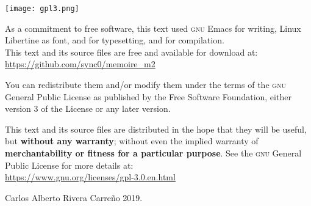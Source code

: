 \newpage
\begin{center}
\vspace*{\fill}
\noindent
\texttt{[image: gpl3.png]}\par
\vspace{1\baselineskip}

As a commitment to free software, this text used  \textsc{gnu}
Emacs for writing, Linux Libertine as font,  \hologo{\fmtname}
and \KOMAScript for typesetting, and   for compilation.\\
\vspace{1\baselineskip}
This text and its source files are free and available for download at:\\
\vspace{1\baselineskip}
\url{https://github.com/sync0/memoire_m2}
\vspace{1\baselineskip}

\noindent You can redistribute them and/or modify them under the terms of
the \textsc{gnu} General Public License as published by the Free Software
Foundation, either version 3 of the License or any later version.

This text and its source files are distributed in the hope that they will
be useful, but \textbf{without any warranty}; without even the implied
warranty of \textbf{merchantability or fitness for a particular purpose}.
See the \textsc{gnu} General Public License for more details at:\\ 
\vspace{1\baselineskip}
\url{https://www.gnu.org/licenses/gpl-3.0.en.html} 

\vspace{1\baselineskip}
\noindent
\textcopyright Carlos Alberto Rivera Carreño 2019.
\end{center}




\newpage 


\newpage
\tableofcontents 